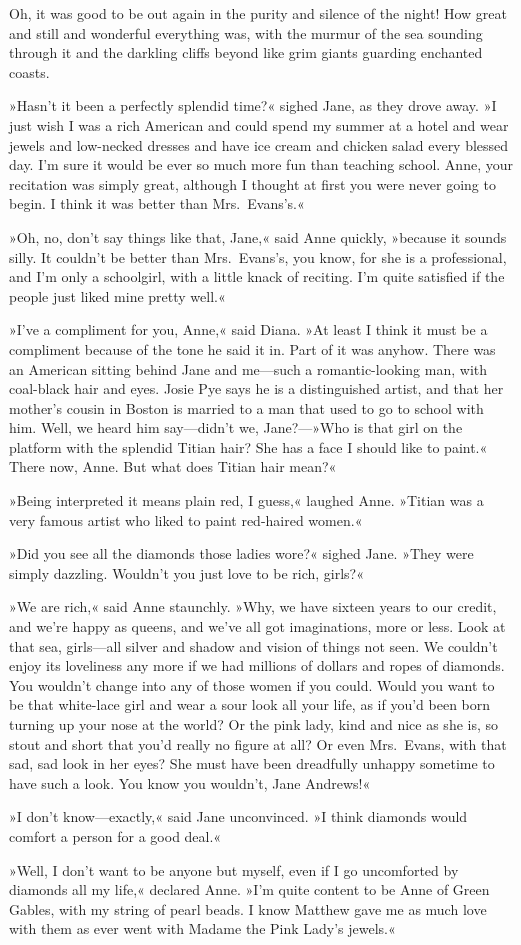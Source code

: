 Oh, it was good to be out again in the purity and silence of the night! How great and still and wonderful everything was, with the murmur of the sea sounding through it and the darkling cliffs beyond like grim giants guarding enchanted coasts.

»Hasn't it been a perfectly splendid time?« sighed Jane, as they drove away. »I just wish I was a rich American and could spend my summer at a hotel and wear jewels and low-necked dresses and have ice cream and chicken salad every blessed day. I'm sure it would be ever so much more fun than teaching school. Anne, your recitation was simply great, although I thought at first you were never going to begin. I think it was better than Mrs.~Evans's.«

»Oh, no, don't say things like that, Jane,« said Anne quickly, »because it sounds silly. It couldn't be better than Mrs.~Evans's, you know, for she is a professional, and I'm only a schoolgirl, with a little knack of reciting. I'm quite satisfied if the people just liked mine pretty well.«

»I've a compliment for you, Anne,« said Diana. »At least I think it must be a compliment because of the tone he said it in. Part of it was anyhow. There was an American sitting behind Jane and me—such a romantic-looking man, with coal-black hair and eyes. Josie Pye says he is a distinguished artist, and that her mother's cousin in Boston is married to a man that used to go to school with him. Well, we heard him say—didn't we, Jane?—»Who is that girl on the platform with the splendid Titian hair? She has a face I should like to paint.« There now, Anne. But what does Titian hair mean?«

»Being interpreted it means plain red, I guess,« laughed Anne. »Titian was a very famous artist who liked to paint red-haired women.«

»Did you see all the diamonds those ladies wore?« sighed Jane. »They were simply dazzling. Wouldn't you just love to be rich, girls?«

»We are rich,« said Anne staunchly. »Why, we have sixteen years to our credit, and we're happy as queens, and we've all got imaginations, more or less. Look at that sea, girls—all silver and shadow and vision of things not seen. We couldn't enjoy its loveliness any more if we had millions of dollars and ropes of diamonds. You wouldn't change into any of those women if you could. Would you want to be that white-lace girl and wear a sour look all your life, as if you'd been born turning up your nose at the world? Or the pink lady, kind and nice as she is, so stout and short that you'd really no figure at all? Or even Mrs.~Evans, with that sad, sad look in her eyes? She must have been dreadfully unhappy sometime to have such a look. You know you wouldn't, Jane Andrews!«

»I don't know—exactly,« said Jane unconvinced. »I think diamonds would comfort a person for a good deal.«

»Well, I don't want to be anyone but myself, even if I go uncomforted by diamonds all my life,« declared Anne. »I'm quite content to be Anne of Green Gables, with my string of pearl beads. I know Matthew gave me as much love with them as ever went with Madame the Pink Lady's jewels.«